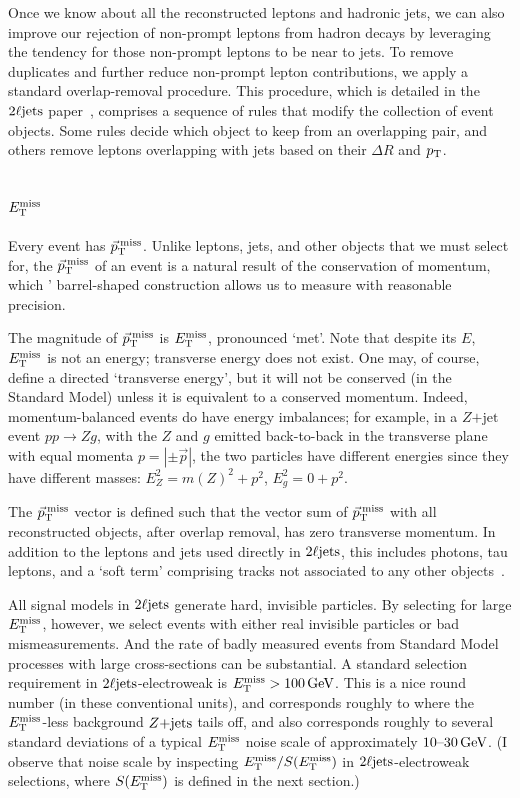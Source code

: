 Once we know about all the reconstructed leptons and hadronic jets, we can
also improve our rejection of non-prompt leptons from hadron decays by
leveraging the tendency for those non-prompt leptons to be near to jets.
To remove duplicates and further reduce non-prompt lepton contributions, we
apply a standard overlap-removal procedure.
This procedure, which is detailed in the $\twoljets$
paper~\cite{atlas2022searches},
comprises a sequence of rules that modify the collection of event objects.
Some rules decide which object to keep from an overlapping pair,
and others remove leptons overlapping with jets based on their $\Delta R$
and $\pt$.


\subsection{\texorpdfstring{$\met$}{ETmiss}}
Every event has $\ptmiss$.
Unlike leptons, jets, and other objects that we must select for, the $\ptmiss$
of an event is a natural result of the conservation of momentum, which \atlas'
barrel-shaped construction allows us to measure with reasonable precision.

The magnitude of $\ptmiss$ is $\met$, pronounced `met'.
Note that despite its $E$, $\met$ is not an energy; transverse energy does not exist.
One may, of course, define a directed `transverse energy', but it will
not be conserved (in the Standard Model) unless it is equivalent to a conserved
momentum.
Indeed, momentum-balanced events do have energy imbalances;
for example, in a $Z\mathrm{+jet}$ event $pp \to Zg$, with the $Z$ and
$g$ emitted back-to-back in the transverse plane with equal momenta
$p = |\pm \vec p|$, the two particles have different energies since they
have different masses: $E_Z^2 = m(Z)^2 + p^2$, $E_g^2 = 0 + p^2$.

The $\ptmiss$ vector is defined such that the vector sum of $\ptmiss$ with
all reconstructed objects, after overlap removal, has zero transverse momentum.
In addition to the leptons and jets used directly in $\twoljets$, this includes
photons, tau leptons, and a `soft term' comprising tracks not associated to
any other objects~\cite{atlas_met}.

All signal models in $\twoljets$ generate hard, invisible particles.
By selecting for large $\met$, however, we select events with either
real invisible particles or bad mismeasurements.
And the rate of badly measured events from Standard Model processes with large
cross-sections can be substantial.
A standard selection requirement in $\twoljets$-electroweak is
$\met > 100\,\eV[G]$.
This is a nice round number (in these conventional units), and corresponds
roughly to where the $\met$-less background $\zjets$ tails off,
and also corresponds roughly to several standard deviations of
a typical $\met$ noise scale of approximately $10\textrm{--}30\,\eV[G]$.
(I observe that noise scale by inspecting $\met / \metsig$ in
$\twoljets$-electroweak selections, where $\metsig$ is defined in the next
section.)


